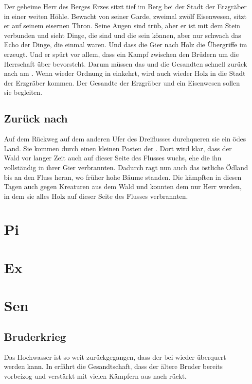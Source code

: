\begin{huge}
Der geheime Herr des Berges Erzes sitzt tief im Berg bei der Stadt der Erzgräber in einer weiten Höhle. Bewacht von seiner Garde, zweimal zwölf Eisenwesen, sitzt er auf seinem eisernen Thron. Seine Augen sind trüb, aber er ist mit dem Stein verbunden und sieht Dinge, die sind und die sein können, aber nur schwach das Echo der Dinge, die einmal waren. Und dass die Gier nach Holz die Übergriffe im \Riesenwald erzeugt. Und er spürt vor allem, dass ein Kampf zwischen den Brüdern um die Herrschaft über \Rhingell bevorsteht. Darum müssen das \Sturmkind und die Gesandten schnell zurück nach \Toris am \Dreifluss. Wenn wieder Ordnung in \Rhingell einkehrt, wird auch wieder Holz in die Stadt der Erzgräber kommen. Der Gesandte \Safir der Erzgräber und ein Eisenwesen sollen sie begleiten.

\section{Zurück nach \Rhingell}
Auf dem Rückweg auf dem anderen Ufer des Dreiflusses durchqueren sie ein ödes Land. Sie kommen durch einen kleinen Posten der \Eisenmeister. Dort wird klar, dass der Wald vor langer Zeit auch auf dieser Seite des Flusses wuchs, ehe die \Eisenmeister ihn vollständig in ihrer Gier verbrannten. Dadurch ragt nun auch das östliche Ödland bis an den Fluss heran, wo früher hohe Bäume standen. Die \Eisenmeister kämpften in diesen Tagen auch gegen Kreaturen aus dem Wald und konnten dem nur Herr werden, in dem sie alles Holz auf dieser Seite des Flusses verbrannten.

\chapter{Pi}

\chapter{Ex}

\chapter{Sen}
\section{Bruderkrieg}
Das Hochwasser ist so weit zurückgegangen, dass der \Dreifluss bei \Toris wieder überquert werden kann. In \Toris erfährt die Gesandtschaft, dass der ältere Bruder bereits vorbeizog und verstärkt mit vielen Kämpfern aus \Toris nach \Rhin rückt. 


\end{huge}
